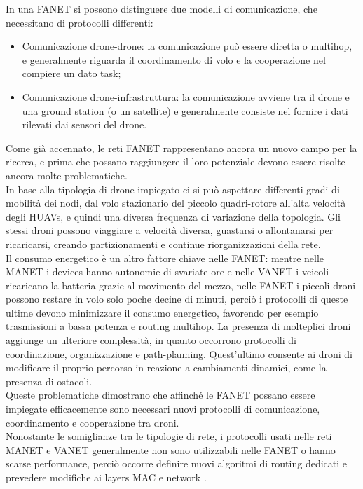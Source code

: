 In una FANET si possono distinguere due modelli di comunicazione, che necessitano di protocolli differenti:
\begin{itemize}
	\item Comunicazione drone-drone: la comunicazione può essere diretta o multihop, e generalmente riguarda il coordinamento di volo e la cooperazione nel compiere un dato task;
	\item Comunicazione drone-infrastruttura: la comunicazione avviene tra il drone e una ground station (o un satellite) e generalmente consiste nel fornire i dati rilevati dai sensori del drone.
\end{itemize}
Come già accennato, le reti FANET rappresentano ancora un nuovo campo per la ricerca, e prima che possano raggiungere il loro potenziale devono essere risolte ancora molte problematiche. \\
In base alla tipologia di drone impiegato ci si può aspettare differenti gradi di mobilità dei nodi, dal volo stazionario del piccolo quadri-rotore all'alta velocità degli HUAVs, e quindi una diversa frequenza di variazione della topologia. 
Gli stessi droni possono viaggiare a velocità diversa, guastarsi o allontanarsi per ricaricarsi, creando partizionamenti e continue riorganizzazioni della rete. \\
Il consumo energetico è un altro fattore chiave nelle FANET: mentre nelle MANET i devices hanno  autonomie di svariate ore e nelle VANET i veicoli ricaricano la batteria grazie al movimento del mezzo, nelle FANET i piccoli droni possono restare in volo solo poche decine di minuti, perciò i protocolli di queste ultime devono minimizzare il consumo energetico, favorendo per esempio trasmissioni a bassa potenza e routing multihop. 
La presenza di molteplici droni aggiunge un ulteriore complessità, in quanto occorrono protocolli di coordinazione, organizzazione e path-planning.
Quest'ultimo consente ai droni di modificare il proprio percorso in reazione a cambiamenti dinamici, come la presenza di ostacoli. \\
Queste problematiche dimostrano che affinché le FANET possano essere impiegate efficacemente sono necessari nuovi  protocolli di comunicazione, coordinamento e cooperazione tra droni. \\
Nonostante le somiglianze tra le tipologie di rete, i protocolli usati nelle reti MANET e VANET generalmente non sono utilizzabili nelle FANET o hanno scarse performance, perciò occorre definire nuovi algoritmi di routing dedicati e prevedere modifiche ai layers MAC e network \cite{7317490}.

